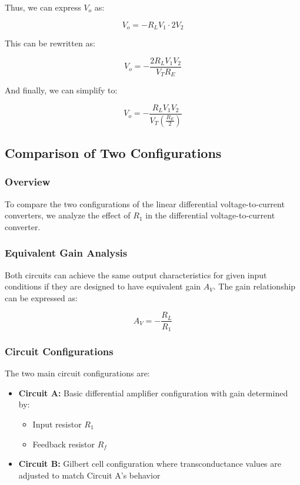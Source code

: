 \documentclass[a4paper,9pt,twoside,openany,twocolumn]{memoir}
\begin{document}
Thus, we can express \( V_o \) as:

\begin{equation}
V_o = -R_L V_1 \cdot 2V_2 \tag{17}
\end{equation}

This can be rewritten as:

\begin{equation}
V_o = -\frac{2R_L V_1 V_2}{V_T R_E} \tag{18}
\end{equation}

And finally, we can simplify to:

\begin{equation}
V_o = -\frac{R_L V_1 V_2}{V_T \left(\frac{R_E}{2}\right)} \tag{19}
\end{equation}

\subsection{Comparison of Two Configurations}

\subsubsection{Overview}
To compare the two configurations of the linear differential voltage-to-current converters, we analyze the effect of \( R_1 \) in the differential voltage-to-current converter.

\subsubsection{Equivalent Gain Analysis}
Both circuits can achieve the same output characteristics for given input conditions if they are designed to have equivalent gain \( A_V \). The gain relationship can be expressed as:

\begin{equation}
A_V = -\frac{R_L}{R_1} \tag{20}
\end{equation}

\subsubsection{Circuit Configurations}
The two main circuit configurations are:

\begin{itemize}
    \item \textbf{Circuit A:} Basic differential amplifier configuration with gain determined by:
    \begin{itemize}
        \item Input resistor \( R_1 \)
        \item Feedback resistor \( R_f \)
    \end{itemize}
    
    \item \textbf{Circuit B:} Gilbert cell configuration where transconductance values are adjusted to match Circuit A's behavior
\end{itemize}
\end{document}
